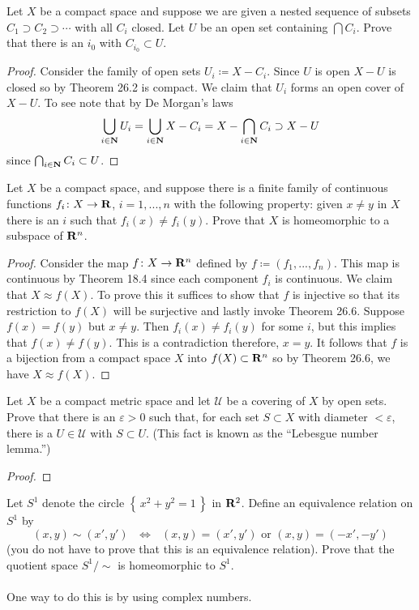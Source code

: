 \begin{problem}
Let $X$ be a compact space and suppose we are given a nested
sequence of subsets $C_1\supset C_2\supset\cdots$ with all $C_i$
closed. Let $U$ be an open set containing $\bigcap C_i$. Prove
that there is an $i_0$ with $C_{i_0}\subset U$.
\end{problem}
\begin{proof}
Consider the family of open sets $U_i\coloneqq X-C_i$. Since $U$
is open $X-U$ is closed so by Theorem 26.2 is compact. We claim
that $U_i$ forms an open cover of $X-U$. To see note that by De
Morgan's laws
\[
\bigcup_{i\in\mathbf{N}} U_i=\bigcup_{i\in\mathbf{N}} X-C_i=X-\bigcap_{i\in\mathbf{N}}
C_i\supset X-U
\]
since $\bigcap_{i\in\mathbf{N}} C_i\subset U$.
\end{proof}
\begin{problem}
Let $X$ be a compact space, and suppose there is a finite family
of continuous functions $f_i\colon X\to\mathbf{R}$, $i=1,...,n$ with the
following property: given $x\neq y$ in $X$ there is an $i$ such
that $f_i(x)\neq f_i(y)$. Prove that $X$ is homeomorphic to a
subspace of $\mathbf{R}^n$.
\end{problem}
\begin{proof}
Consider the map $f\colon X\to\mathbf{R}^n$ defined by
$f\coloneqq(f_1,...,f_n)$. This map is continuous by Theorem 18.4
since each component $f_i$ is continuous. We claim that $X\approx
f(X)$. To prove this it suffices to show that $f$ is injective so
that its restriction to $f(X)$ will be surjective and lastly
invoke Theorem 26.6. Suppose $f(x)=f(y)$ but $x\neq y$. Then
$f_i(x)\neq f_i(y)$ for some $i$, but this implies that $f(x)\neq
f(y)$. This is a contradiction therefore, $x=y$. It follows that
$f$ is a bijection from a compact space $X$ into
$f(X)\subset\mathbf{R}^n$ so by Theorem 26.6, we have $X\approx f(X)$.
\end{proof}
\begin{problem}
Let $X$ be a compact metric space and let $\mathcal{U}$ be a
covering of $X$ by open sets. Prove that there is an
$\varepsilon>0$ such that, for each set $S\subset X$ with
diameter $<\varepsilon$, there is a $U\in\mathcal{U}$ with
$S\subset U$. (This fact is known as the ``Lebesgue number lemma.'')
\end{problem}
\begin{proof}
\end{proof}
\begin{problem}
Let $S^1$ denote the circle $\left\{\,x^2+y^2=1\,\right\}$ in
$\mathbf{R}^2$. Define an equivalence relation on $S^1$ by
\[\text{$(x,y)\sim (x',y')$ $\iff$ $(x,y)=(x',y')$ or $(x,y)=(-x',-y')$}\]
(you do not have to prove that this is an equivalence
relation). Prove that the quotient space $S^1/{\sim}$ is
homeomorphic to $S^1$.
\\\\
One way to do this is by using complex numbers.
\end{problem}
